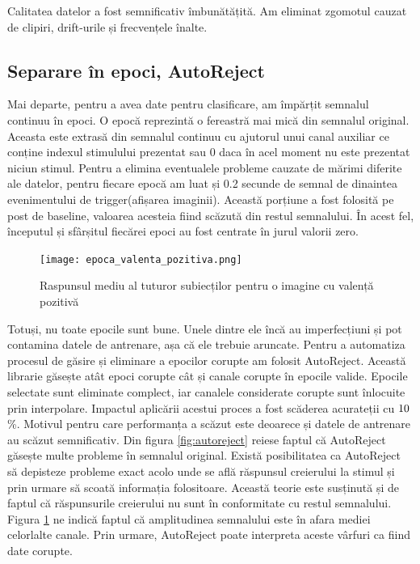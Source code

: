 Calitatea datelor a fost semnificativ îmbunătățită. Am eliminat zgomotul cauzat de clipiri, drift-urile și frecvențele înalte.

\subsection{Separare în epoci, AutoReject}

Mai departe, pentru a avea date pentru clasificare, am împărțit semnalul continuu în epoci. O epocă reprezintă o fereastră mai mică din semnalul original. Aceasta este extrasă din semnalul continuu cu ajutorul unui canal auxiliar ce conține indexul stimulului prezentat sau 0 daca în acel moment nu este prezentat niciun stimul. Pentru a elimina eventualele probleme cauzate de mărimi diferite ale datelor, pentru fiecare epocă am luat și 0.2 secunde de semnal de dinaintea evenimentului de trigger(afișarea imaginii). Această porțiune a fost folosită pe post de baseline, valoarea acesteia fiind scăzută din restul semnalului. În acest fel, începutul și sfârșitul fiecărei epoci au fost centrate în jurul valorii zero.

\setlength{\abovecaptionskip}{0pt}
\setlength{\belowcaptionskip}{0pt}
\clearpage
\begin{figure}
    \centering
    \texttt{[image: epoca\_valenta\_pozitiva.png]}
    \caption{Raspunsul mediu al tuturor subiecților pentru o imagine cu valență pozitivă}
    \label{fig:raspuns_mediu}
\end{figure}

Totuși, nu toate epocile sunt bune. Unele dintre ele încă au imperfecțiuni și pot contamina datele de antrenare, așa că ele trebuie aruncate. Pentru a automatiza procesul de găsire și eliminare a epocilor corupte am folosit AutoReject\cite{AutoReject}. Această librarie găsește atât epoci corupte cât și canale corupte în epocile valide. Epocile selectate sunt eliminate complect, iar canalele considerate corupte sunt înlocuite prin interpolare. Impactul aplicării acestui proces a fost scăderea acurateții cu $10$\%. Motivul pentru care performanța a scăzut este deoarece și datele de antrenare au scăzut semnificativ. Din figura \ref{fig:autoreject} reiese faptul că AutoReject găsește multe probleme în semnalul original. Există posibilitatea ca AutoReject să depisteze probleme exact acolo unde se află răspunsul creierului la stimul și prin urmare să scoată informația folositoare. Această teorie este susținută și de faptul că răspunsurile creierului nu sunt în conformitate cu restul semnalului. Figura \ref{fig:raspuns_mediu} ne indică faptul că amplitudinea semnalului este în afara mediei celorlalte canale. Prin urmare, AutoReject poate interpreta aceste vârfuri ca fiind date corupte.

